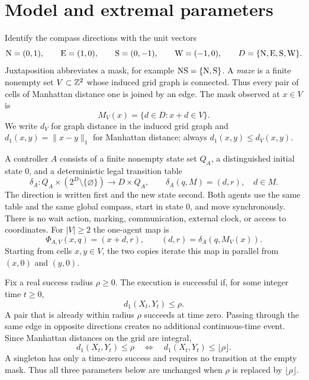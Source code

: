 \section{Model and extremal parameters}\label{sec:general-model}\label{sec:model}

Identify the compass directions with the unit vectors
\[
 \mathrm{N}=(0,1),\qquad \mathrm{E}=(1,0),\qquad \mathrm{S}=(0,-1),\qquad \mathrm{W}=(-1,0),
 \qquad D=\{\mathrm{N},\mathrm{E},\mathrm{S},\mathrm{W}\}.
\]
Juxtaposition abbreviates a mask, for example $\mathrm{N}\mathrm{S}=\{\mathrm{N},\mathrm{S}\}$.
A \emph{maze} is a finite nonempty set $V\subset\mathbb Z^2$ whose induced grid graph is connected.  Thus every pair of cells of Manhattan distance one is joined by an edge.  The mask observed at $x\in V$ is
\[
 M_V(x)=\{d\in D:x+d\in V\}.
\]
We write $d_V$ for graph distance in the induced grid graph and $d_1(x,y)=\|x-y\|_1$ for Manhattan distance; always $d_1(x,y)\le d_V(x,y)$.

\begin{definition}\label{def:controller-general}
A controller $A$ consists of a finite nonempty state set $Q_A$, a distinguished initial state $0$, and a deterministic legal transition table
\[
 \delta_A:Q_A\times(2^D\setminus\{\varnothing\})\longrightarrow D\times Q_A,
 \qquad \delta_A(q,M)=(d,r),\quad d\in M.
\]
The direction is written first and the new state second.  Both agents use the same table and the same global compass, start in state $0$, and move synchronously.  There is no wait action, marking, communication, external clock, or access to coordinates.  For $|V|\ge2$ the one-agent map is
\[
 \Phi_{A,V}(x,q)=(x+d,r),\qquad (d,r)=\delta_A(q,M_V(x)).
\]
Starting from cells $x,y\in V$, the two copies iterate this map in parallel from $(x,0)$ and $(y,0)$.
\end{definition}

Fix a real success radius $\rho\ge0$.  The execution is successful if, for some integer time $t\ge0$,
\[
 d_1(X_t,Y_t)\le\rho.
\]
A pair that is already within radius $\rho$ succeeds at time zero.  Passing through the same edge in opposite directions creates no additional continuous-time event.  Since Manhattan distances on the grid are integral,
\begin{equation}\label{eq:integer-radius}
 d_1(X_t,Y_t)\le\rho
 \quad\Longleftrightarrow\quad
 d_1(X_t,Y_t)\le\lfloor\rho\rfloor .
\end{equation}
A singleton has only a time-zero success and requires no transition at the empty mask.
Thus all three parameters below are unchanged when $\rho$ is replaced by $\lfloor\rho\rfloor$.

